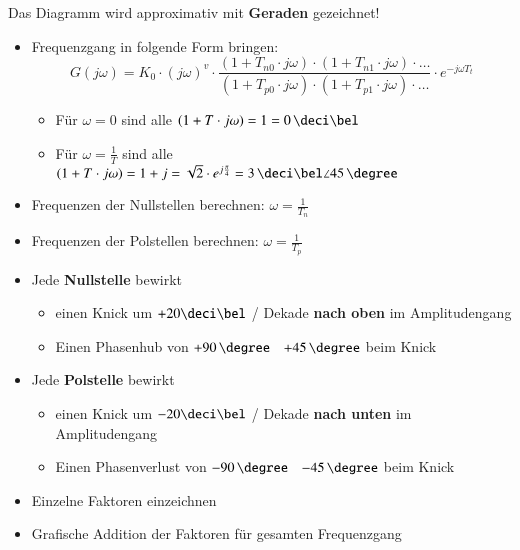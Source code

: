 Das Diagramm wird approximativ mit \textbf{Geraden} gezeichnet!

\begin{itemize}
    \item Frequenzgang in folgende Form bringen:
        $$ G(j \omega) = K_0 \cdot (j \omega)^v \cdot \frac{(1 + T_{n0} \cdot j \omega)\cdot (1 + T_{n1} \cdot j \omega) \cdot \ldots}
        {(1 + T_{p0} \cdot j \omega)\cdot (1 + T_{p1} \cdot j \omega) \cdot \ldots} \cdot e^{- j \omega T_t} $$
    \begin{itemize}
        \item Für $\omega = 0$ sind alle $(1 + T \cdot j \omega) = 1 = 0 \, \deci \bel$
        \item Für $\omega = \frac{1}{T}$ sind alle  $(1 + T \cdot j \omega) = 1 + j = \sqrt{2} \cdot e^{j \frac{\pi}{4}} 
            = 3 \, \deci \bel \angle 45 \, \degree$
    \end{itemize}
    \item Frequenzen der Nullstellen berechnen: $\omega = \frac{1}{T_n}$
    \item Frequenzen der Polstellen berechnen: $\omega = \frac{1}{T_p}$


    \item Jede \textbf{Nullstelle} bewirkt
    \begin{itemize}
        \item einen Knick um $+ 20 \deci \bel$ / Dekade \textbf{nach oben} im Amplitudengang
        \item Einen Phasenhub von $+ 90 \, \degree$ \textrightarrow\ $+ 45 \, \degree$ beim Knick
    \end{itemize}
    \item Jede \textbf{Polstelle} bewirkt
    \begin{itemize}
        \item einen Knick um $- 20 \deci \bel$ / Dekade \textbf{nach unten} im Amplitudengang
        \item Einen Phasenverlust von $- 90 \, \degree$ \textrightarrow\ $- 45 \, \degree$ beim Knick
    \end{itemize}
    \item Einzelne Faktoren einzeichnen
    \item Grafische Addition der Faktoren für gesamten Frequenzgang
\end{itemize}




%